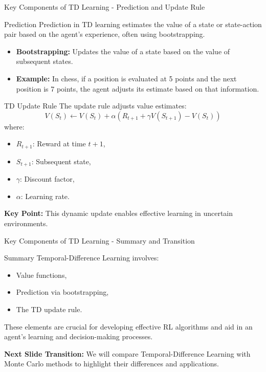 \documentclass[aspectratio=169]{beamer}
\begin{document}
\begin{frame}[fragile]{Key Components of TD Learning - Prediction and Update Rule}
    \begin{block}{Prediction}
        Prediction in TD learning estimates the value of a state or state-action pair based on the agent's experience, often using bootstrapping.
    \end{block}

    \begin{itemize}
        \item \textbf{Bootstrapping:} Updates the value of a state based on the value of subsequent states.
        \item \textbf{Example:} In chess, if a position is evaluated at 5 points and the next position is 7 points, the agent adjusts its estimate based on that information.
    \end{itemize}

    \begin{block}{TD Update Rule}
        The update rule adjusts value estimates:
        \begin{equation}
            V(S_t) \gets V(S_t) + \alpha \left( R_{t+1} + \gamma V(S_{t+1}) - V(S_t) \right)
        \end{equation}
        where:
        \begin{itemize}
            \item $R_{t+1}$: Reward at time $t+1$,
            \item $S_{t+1}$: Subsequent state,
            \item $\gamma$: Discount factor,
            \item $\alpha$: Learning rate.
        \end{itemize}
    \end{block}

    \textbf{Key Point:} This dynamic update enables effective learning in uncertain environments.
\end{frame}

\begin{frame}[fragile]{Key Components of TD Learning - Summary and Transition}
    \begin{block}{Summary}
        Temporal-Difference Learning involves:
        \begin{itemize}
            \item Value functions,
            \item Prediction via bootstrapping,
            \item The TD update rule.
        \end{itemize}
        These elements are crucial for developing effective RL algorithms and aid in an agent's learning and decision-making processes.
    \end{block}

    \textbf{Next Slide Transition:} 
    We will compare Temporal-Difference Learning with Monte Carlo methods to highlight their differences and applications.
\end{frame}
\end{document}

